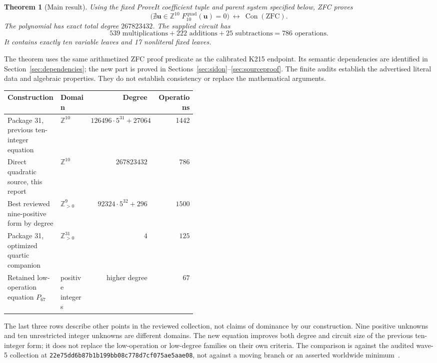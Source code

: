 \documentclass[11pt,letterpaper]{article}
\newtheorem{theorem}{Theorem}[section]
\theoremstyle{definition}\newtheorem{definition}[theorem]{Definition}
\theoremstyle{remark}\newtheorem{remark}[theorem]{Remark}
\newcommand{\Z}{\mathbb Z}
\newcommand{\Con}{\operatorname{Con}}
\newcommand{\srcpin}{\texttt{22e75dd6b87b1b199bb08c778d7cf075ae5aae08}}
\begin{document}
\begin{theorem}[Main result]\label{thm:main}
Using the fixed ProveIt coefficient tuple and parent system specified below, ZFC proves
\[
 \boxed{\quad
 \bigl(\nexists\mathbf u\in\Z^{10}\;F_{10}^{\mathrm{quad}}(\mathbf u)=0\bigr)
 \ \longleftrightarrow\ \Con(\mathrm{ZFC}).\quad}
\]
The polynomial has exact total degree $267823432$. The supplied circuit has
\[
 539\text{ multiplications}+222\text{ additions}+25\text{ subtractions}
 =786\text{ operations}.
\]
It contains exactly ten variable leaves and 17 nonliteral fixed leaves.
\end{theorem}

The theorem uses the same arithmetized ZFC proof predicate as the calibrated K215 endpoint. Its semantic dependencies are identified in Section~\ref{sec:dependencies}; the new part is proved in Sections~\ref{sec:sidon}--\ref{sec:sourceproof}. The finite audits establish the advertised literal data and algebraic properties. They do not establish consistency or replace the mathematical arguments.

\begin{center}\small
\begin{tabular}{>{\raggedright\arraybackslash}p{0.28\linewidth}>{\raggedright\arraybackslash}p{0.16\linewidth}r r}
\toprule
Construction & Domain & Degree & Operations\\
\midrule
Package 31, previous ten-integer equation & $\Z^{10}$ & $126496\cdot5^{31}+27064$ & 1442\\
Direct quadratic source, this report & $\Z^{10}$ & $267823432$ & $786$\\
Best reviewed nine-positive form by degree & $\Z_{>0}^{9}$ & $92324\cdot5^{32}+296$ & $1500$\\
Package 31, optimized quartic companion & $\Z_{>0}^{31}$ & $4$ & $125$\\
Retained low-operation equation $P_{67}$ & positive integers & higher degree & $67$\\
\bottomrule
\end{tabular}
\end{center}

The last three rows describe other points in the reviewed collection, not claims of dominance by our construction. Nine positive unknowns and ten unrestricted integer unknowns are different domains. The new equation improves both degree and circuit size of the previous ten-integer form; it does not replace the low-operation or low-degree families on their own criteria. The comparison is against the audited wave-5 collection at \srcpin, not against a moving branch or an asserted worldwide minimum~\cite{collection}.
\end{document}
